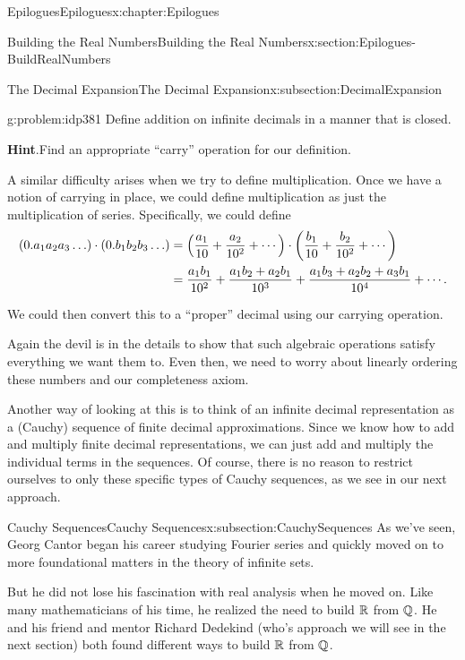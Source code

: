 \begin{chapterptx}{Epilogues}{}{Epilogues}{}{}{x:chapter:Epilogues}
\begin{sectionptx}{Building the Real Numbers}{}{Building the Real Numbers}{}{}{x:section:Epilogues-BuildRealNumbers}
\begin{subsectionptx}{The Decimal Expansion}{}{The Decimal Expansion}{}{}{x:subsection:DecimalExpansion}
			\begin{problem}{}{g:problem:idp381}%
				Define addition on infinite decimals in a manner that is closed.%
				\par\smallskip%
				\noindent\textbf{\blocktitlefont Hint}.\hypertarget{g:hint:idp382}{}\quad{}Find an appropriate ``carry'' operation for our definition.%
			\end{problem}
			A similar difficulty arises when we try to define multiplication. Once we have a notion of carrying in place, we could define multiplication as just the multiplication of series. Specifically, we could define%
			\begin{align*}
				(0.a_1a_2a_3\ldots)\cdot(0.b_1b_2b_3\ldots) & =\left(\frac{a_1}{10}+\frac{a_2}{10^2}+\cdots\right) \cdot\left(\frac{b_1}{10}+\frac{b_2}{10^2}+\cdots\right)\\
				& =\frac{a_1b_1}{10^2}+\frac{a_1b_2+a_2b_1}{10^3}+\frac{a_1b_3+a_2b_2+a_3b_1}{10^4}+\cdots\text{.}
			\end{align*}
			\par
			We could then convert this to a ``proper'' decimal using our carrying operation.%
			\par
			Again the devil is in the details to show that such algebraic operations satisfy everything we want them to. Even then, we need to worry about linearly ordering these numbers and our completeness axiom.%
			\par
			Another way of looking at this is to think of an infinite decimal representation as a (Cauchy) sequence of finite decimal approximations. Since we know how to add and multiply finite decimal representations, we can just add and multiply the individual terms in the sequences. Of course, there is no reason to restrict ourselves to only these specific types of Cauchy sequences, as we see in our next approach.%
		\end{subsectionptx}
		\typeout{************************************************}
		\typeout{************************************************}
		\begin{subsectionptx}{Cauchy Sequences}{}{Cauchy Sequences}{}{}{x:subsection:CauchySequences}
			As we've seen, Georg Cantor  began his career studying Fourier series and quickly moved on to more foundational matters in the theory of infinite sets.%
			\par
			But he did not lose his fascination with real analysis when he moved on. Like many mathematicians of his time, he realized the need to build \(\mathbb {R}\) from \(\mathbb {Q}\). He and his friend and mentor Richard Dedekind  (who's approach we will see in the next section) both found different ways to build \(\mathbb {R}\) from \(\mathbb {Q}\).%

\end{subsectionptx}
\end{sectionptx}
\end{chapterptx}

